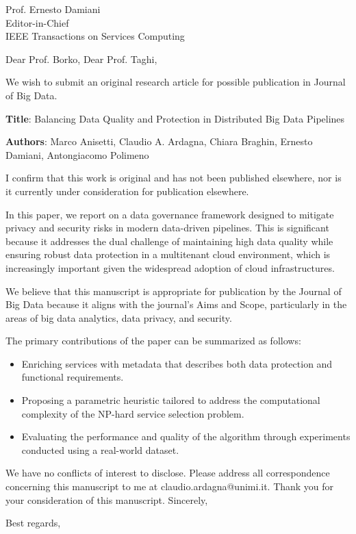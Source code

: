 \documentclass[12pt]{sriletter}
\begin{document}
\begin{letter}{%
        Prof. Ernesto Damiani\\
        Editor-in-Chief\\
        IEEE Transactions on Services Computing\\
    }

    \opening{Dear Prof. Borko, Dear Prof. Taghi,}

    We wish to submit an original research article for possible publication in Journal of Big Data.

    \textbf{Title}: Balancing Data Quality and Protection in Distributed Big Data Pipelines

    \textbf{Authors}: Marco Anisetti, Claudio A. Ardagna, Chiara Braghin, Ernesto Damiani, Antongiacomo Polimeno

    I confirm that this work is original and has not been published elsewhere, nor is it currently under consideration for publication elsewhere.

    In this paper, we report on a data governance framework designed to mitigate privacy and security risks in modern data-driven pipelines.
    This is significant because it addresses the dual challenge of maintaining high data quality while ensuring robust data protection in a multitenant cloud environment,
    which is increasingly important given the widespread adoption of cloud infrastructures.

    We believe that this manuscript is appropriate for publication by the Journal of Big Data because it aligns with the journal’s Aims and Scope,
    particularly in the areas of big data analytics, data privacy, and security.

    The primary contributions of the paper can be summarized as follows:
    \begin{itemize}
        \item Enriching services with metadata that describes both data protection and functional requirements.
        \item Proposing a parametric heuristic tailored to address the computational complexity of the NP-hard service selection problem.
        \item Evaluating the performance and quality of the algorithm through experiments conducted using a real-world dataset.
    \end{itemize}

    We have no conflicts of interest to disclose.
    Please address all correspondence concerning this manuscript to me at claudio.ardagna@unimi.it.
    Thank you for your consideration of this manuscript.
    Sincerely,


    \closing{Best regards,}

\end{letter}
\end{document}
